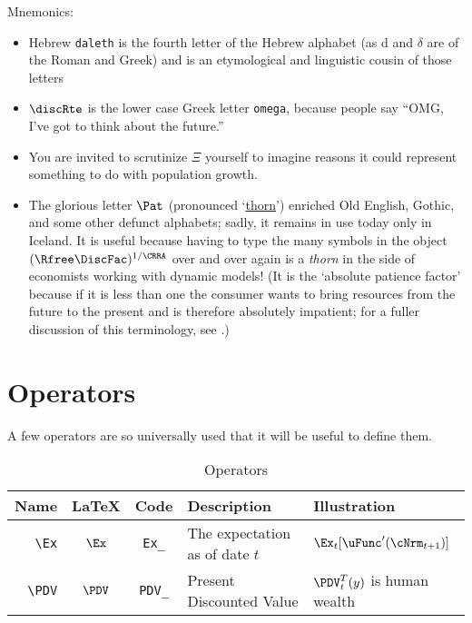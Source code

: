 \documentclass[12pt]{\econtex}
\begin{document}
Mnemonics:
\begin{itemize}
\item Hebrew \texttt{daleth} is the fourth letter of the Hebrew alphabet (as d and $\delta$ are of the Roman and Greek) and is an etymological and linguistic cousin of those letters
\item $\discRte$ is the lower case Greek letter \texttt{omega}, because people say ``OMG, I've got to think about the future.''
\item You are invited to scrutinize $\Xi$ yourself to imagine reasons it could represent something to do with population growth.  
\item The glorious letter $\Pat$ (pronounced `\href{http://en.wikipedia.org/wiki/Thorn_(letter)}{thorn}') enriched Old English, Gothic, and some other defunct alphabets; sadly, it remains in use today only in Iceland.  It is useful because having to type the many symbols in the object $(\Rfree \DiscFac)^{1/\CRRA}$ over and over again is a \textit{thorn} in the side of economists working with dynamic models!  (It is the `absolute patience factor' because if it is less than one the consumer wants to bring resources from the future to the present and is therefore absolutely impatient; for a fuller discussion of this terminology, see \cite{carrollTractable}.)
\end{itemize}


\hypertarget{Operators}{}
\section{Operators}
A few operators are so universally used that it will be useful to define them.

\begin{table}[ht]
  \centering
  \begin{tabular}{|>{\ttfamily}rccll|} 		
    \hline
    Name    & \LaTeX         & Code & Description & Illustration
    \\ \hline
    \verb|\Ex|        & $\Ex$       & \texttt{Ex\_} & The expectation as of date $t$ & $\Ex_{t}[\uFunc^{\prime}(\cNrm_{t+1})]$
    \\   \verb|\PDV|        & $\PDV$       & \texttt{PDV\_} & Present Discounted Value & $\PDV_{t}^{T}(y)$ is human wealth
    \\	\hline
  \end{tabular}
  \caption{Operators}
  \label{table:Operators}
\end{table}	


\medskip\medskip
\end{document}
